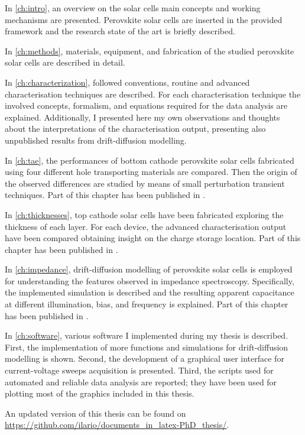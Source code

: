 
\hspace{\parindent}In \cref{ch:intro}, an overview on the solar cells main concepts and working mechanisms are presented.
Perovskite solar cells are inserted in the provided framework and the research state of the art is briefly described.

In \cref{ch:methods}, materials, equipment, and fabrication of the studied perovskite solar cells are described in detail.

In \cref{ch:characterization}, followed conventions, routine and advanced characterisation techniques are described.
For each characterisation technique the involved concepts, formalism, and equations required for the data analysis are explained.
Additionally, I presented here my own observations and thoughts about the interpretations of the characterisation output, presenting also unpublished results from drift\hyp{}diffusion modelling.

In \cref{ch:tae}, the performances of bottom cathode perovskite solar cells fabricated using four different hole transporting materials are compared.
Then the origin of the observed differences are studied by means of small perturbation transient techniques.
Part of this chapter has been published in \cite{Gelmetti2019}.

In \cref{ch:thicknesses}, top cathode solar cells have been fabricated exploring the thickness of each layer.
For each device, the advanced characterisation output have been compared obtaining insight on the charge storage location.
Part of this chapter has been published in \cite{Gelmetti2017}.

In \cref{ch:impedance}, drift\hyp{}diffusion modelling of perovskite solar cells is employed for understanding the features observed in impedance spectroscopy.
Specifically, the implemented simulation is described and the resulting apparent capacitance at different illumination, bias, and frequency is explained.
Part of this chapter has been published in \cite{Moia2019}.

In \cref{ch:software}, various software I implemented during my thesis is described.
First, the implementation of more functions and simulations for drift\hyp{}diffusion modelling is shown.
Second, the development of a graphical user interface for current\hyp{}voltage sweeps acquisition is presented.
Third, the scripts used for automated and reliable data analysis are reported; they have been used for plotting most of the graphics included in this thesis.

An updated version of this thesis can be found on \url{https://github.com/ilario/documents_in_latex-PhD_thesis/}.